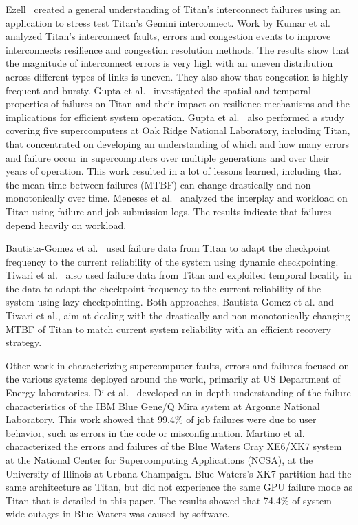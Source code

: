 Ezell~\cite{osti_1086655} created a general understanding of Titan's interconnect failures using an application to stress test Titan's Gemini interconnect.
%
Work by Kumar et al.~\cite{kumar18understanding} analyzed Titan's interconnect faults, errors and congestion events to improve interconnects resilience and congestion resolution methods. The results show that the magnitude of interconnect errors is very high with an uneven distribution across different types of links is uneven. They also show that congestion is highly frequent and bursty.
%
Gupta et al.~\cite{7266836} investigated the spatial and temporal properties of failures on Titan and their impact on resilience mechanisms and the implications for efficient system operation.
%
Gupta et al.~\cite{gupta17failures} also performed a study covering five supercomputers at Oak Ridge National Laboratory, including Titan, that concentrated on developing an understanding of which and how many errors and failure occur in supercomputers over multiple generations and over their years of operation. This work resulted in a lot of lessons learned, including that the mean-time between failures (MTBF) can change drastically and non-monotonically over time.
%
Meneses et al.~\cite{Meneses15Analyzing} analyzed the interplay and workload on Titan using failure and job submission logs. The results indicate that failures depend heavily on workload.

Bautista-Gomez et al.~\cite{bautista-gomez16reducing} used failure data from Titan to adapt the checkpoint frequency to the current reliability of the system using dynamic checkpointing.
%
Tiwari et al.~\cite{6903564} also used failure data from Titan and exploited temporal locality in the data to adapt the checkpoint frequency to the current reliability of the system using lazy checkpointing.
%
Both approaches, Bautista-Gomez et al. and Tiwari et al., aim at dealing with the drastically and non-monotonically changing MTBF of Titan to match current system reliability with an efficient recovery strategy.

Other work in characterizing supercomputer faults, errors and failures focused on the various systems deployed around the world, primarily at US Department of Energy laboratories.
%
Di et al.~\cite{8809553} developed an in-depth understanding of the failure characteristics of the IBM Blue Gene/Q Mira system at Argonne National Laboratory. This work showed that 99.4\% of job failures were due to user behavior, such as errors in the code or misconfiguration. Martino et al.~\cite{6903615} characterized the errors and failures of the Blue Waters Cray XE6/XK7 system at the National Center for Supercomputing Applications (NCSA), at the University of Illinois at Urbana-Champaign. Blue Waters's XK7 partition had the same architecture as Titan, but did not experience the same GPU failure mode as Titan that is detailed in this paper. The results showed that 74.4\% of system-wide outages in Blue Waters was caused by software.
